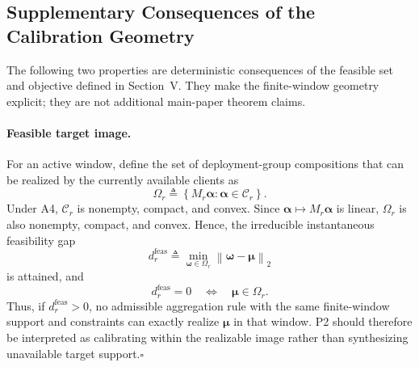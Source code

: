 \subsection{Supplementary Consequences of the Calibration Geometry}
\label{app:supp_calibration_geometry}

The following two properties are deterministic consequences of the feasible
set and objective defined in Section~V.  They make the
finite-window geometry explicit; they are not additional main-paper theorem
claims.

\paragraph{Feasible target image.}
For an active window, define the set of deployment-group compositions that can
be realized by the currently available clients as
\begin{equation}
 \Omega_r
 \triangleq
 \left\{
 M_r\boldsymbol\alpha:
 \boldsymbol\alpha\in\mathcal C_r
 \right\}.
 \label{eq:app_feasible_target_image}
\end{equation}
Under A4, $\mathcal C_r$ is nonempty, compact, and convex.  Since
$\boldsymbol\alpha\mapsto M_r\boldsymbol\alpha$ is linear, $\Omega_r$ is also
nonempty, compact, and convex.  Hence, the irreducible instantaneous
feasibility gap
\begin{equation}
 d_r^{\mathrm{feas}}
 \triangleq
 \min_{\boldsymbol\omega\in\Omega_r}
 \left\|
 \boldsymbol\omega-\boldsymbol\mu
 \right\|_2
 \label{eq:app_feasibility_gap}
\end{equation}
is attained, and
\begin{equation}
 d_r^{\mathrm{feas}}=0
 \quad\Longleftrightarrow\quad
 \boldsymbol\mu\in\Omega_r.
 \label{eq:app_exact_realizability}
\end{equation}
Thus, if $d_r^{\mathrm{feas}}>0$, no admissible aggregation rule with the same
finite-window support and constraints can exactly realize
$\boldsymbol\mu$ in that window.  P2 should therefore be interpreted as
calibrating within the realizable image rather than synthesizing unavailable
target support.\hfill$\square$

